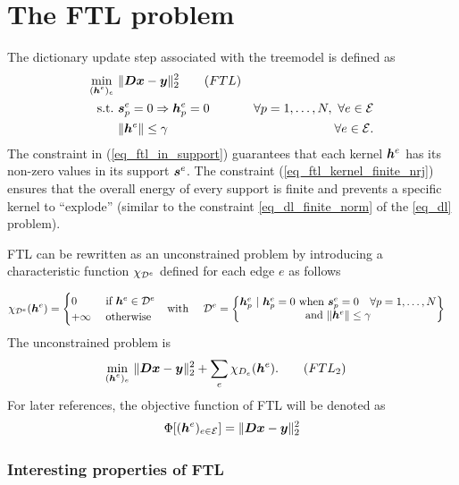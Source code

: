 \section{The \acs{FTL} problem}

The dictionary update step associated with the \gls{treemodel} is defined as
\begin{align}
\underset{\substack{(\bm{h}^e)_{e}}}\min ~ & \lVert \bm{D}\bm{x} - \bm{y} \rVert_2^2 \tag{$FTL$}\label{eq_ftl}\\
\text{s.t.~} & \bm{s}^e_p=0 \Rightarrow \bm{h}^e_p = 0 \quad & \forall p=1,\dots,N ,~\forall e \in \mathcal E\label{eq_ftl_in_support} \\
 & \lVert \bm{h}^e \rVert \le \gamma & \forall e \in \mathcal E.\label{eq_ftl_kernel_finite_nrj}
\end{align} 
The constraint in (\ref{eq_ftl_in_support}) guarantees that each kernel $\bm{h}^e$ has its non-zero values in its support $\bm{s}^e$. The constraint (\ref{eq_ftl_kernel_finite_nrj}) ensures that the overall energy of every support is finite and prevents a specific kernel to “explode” (similar to the constraint \eqref{eq_dl_finite_norm} of the \eqref{eq_dl} problem).

\ac{FTL} can be rewritten as an unconstrained problem by introducing a characteristic function $\chi_{{\mathcal D}^e}$ defined for each edge $e$ as follows

\begin{align*}
	\chi_{{\mathcal D}^e}(\bm{h}^e) = \begin{cases} 0 &\text{ if } \bm{h}^e \in {\mathcal D}^e \\ +\infty & \ \text{otherwise}\end{cases} & \quad \text{with} \quad \
		{\mathcal D}^e = \begin{Bmatrix}  \bm{h}^e_p ~|~ \bm{h}^e_p=0 ~\text{when}~ \bm{s}^e_p=0 \quad \forall p=1,\dots,N\\ \text{and }\lVert \bm{h}^e \rVert \le \gamma \end{Bmatrix}
\end{align*}
The unconstrained problem is
\begin{align}
\underset{\substack{(\h^e)_{e}}}\min ~ & \lVert \D\x - \y \rVert_2^2 + \sum_{e}\chi_{D_e} (\h^e). \tag{${FTL}_2$}\label{eq_ftl2}
\end{align}
For later references, the objective function of \ac{FTL} will be denoted as
\begin{align}
\Phi[(\bm{h}^e)_{e \in \mathcal E}] = \lVert \bm{D}\bm{x}-\bm{y} \rVert^2_2
\end{align}


\subsubsection{Interesting properties of \ac{FTL}}

